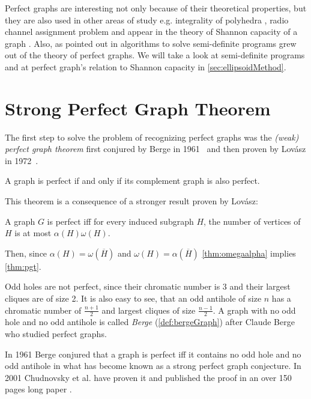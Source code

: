 Perfect graphs are interesting not only because of their theoretical properties, but they are also used in other areas of study e.g. integrality of polyhedra \cite{Chvtal1975, Chudnovsky2003}, radio channel assignment problem \cite{McDiarmid99, McDiarmid2000} and appear in the theory of Shannon capacity of a graph \cite{Lovasz1979}. Also, as pointed out in \cite{alfonsinPerfect2001, Chudnovsky2003} algorithms to solve semi-definite programs grew out of the theory of perfect graphs. We will take a look at semi-definite programs and at perfect graph's relation to Shannon capacity in \cref{sec:ellipsoidMethod}.

\section{Strong Perfect Graph Theorem}
\label{sec:SPGT}

The first step to solve the problem of recognizing perfect graphs was the \emph{(weak) perfect graph theorem} first conjured by Berge in 1961~\cite{CB61} and then proven by Lovász in 1972~\cite{LL72}.

\begin{theorem}
	\label{thm:pgt}
	A graph is perfect if and only if its complement graph is also perfect.
\end{theorem}

This theorem is a consequence of a stronger result proven by Lovász:
\begin{theorem}
	\label{thm:omegaalpha}
	A graph $G$ is perfect iff for every induced subgraph $H$, the number of vertices of $H$ is at most $\alpha(H)\omega(H)$. 
\end{theorem}

Then, since $\alpha(H) = \omega(\overline{H})$ and $\omega(H) = \alpha(\overline{H})$ \cref{thm:omegaalpha} implies \cref{thm:pgt}.

Odd holes are not perfect, since their chromatic number is 3 and their largest cliques are of size 2. It is also easy to see, that an odd antihole of size $n$ has a chromatic number of $\frac{n+1}{2}$ and largest cliques of size $\frac{n-1}{2}$. A graph with no odd hole and no odd antihole is called \emph{Berge} (\cref{def:bergeGraph}) after Claude Berge who studied perfect graphs.

In 1961 Berge conjured that a graph is perfect iff it contains no odd hole and no odd antihole in what has become known as a strong perfect graph conjecture. In 2001 Chudnovsky et al. have proven it and published the proof in an over 150 pages long paper  \cite{MC06}.

